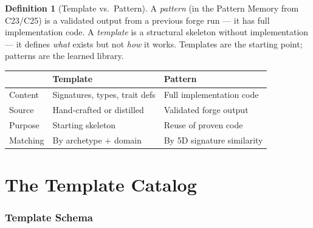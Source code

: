 \documentclass[11pt,a4paper,twoside]{article}
\theoremstyle{definition}
\newtheorem{definition}{Definition}[section]
\theoremstyle{plain}
\theoremstyle{remark}
\begin{document}
\begin{definition}[Template vs.\ Pattern]\label{def:tvsp}
A \emph{pattern} (in the Pattern Memory from C23/C25) is a validated
output from a previous forge run — it has full implementation code.
A \emph{template} is a structural skeleton without implementation —
it defines \emph{what} exists but not \emph{how} it works. Templates
are the starting point; patterns are the learned library.

\begin{tabularx}{\textwidth}{l X X}
\toprule
& \textbf{Template} & \textbf{Pattern} \\
\midrule
Content & Signatures, types, trait defs & Full implementation code \\
Source & Hand-crafted or distilled & Validated forge output \\
Purpose & Starting skeleton & Reuse of proven code \\
Matching & By archetype + domain & By 5D signature similarity \\
\bottomrule
\end{tabularx}
\end{definition}


\part{The Template Catalog}\label{part:catalog}

\section{Template Schema}\label{sec:schema}
\end{document}
